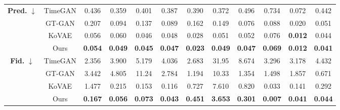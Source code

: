\documentclass{article}
\theoremstyle{plain}
\theoremstyle{definition}
\theoremstyle{remark}
\begin{document}
\begin{table}[!t]
{\begin{tabular}{cc|cccccccccc}
    \multirow{4}{*}{\textbf{Pred.} $\downarrow$} 
      & TimeGAN 
         & 0.436 
         & 0.359 
         & 0.401 
         & 0.387 
         & 0.390 
         & 0.372 
         & 0.496 
         & 0.734 
         & 0.072 
         & 0.442 \\
      & GT-GAN  
         & 0.207 
         & 0.094 
         & 0.137 
         & 0.089 
         & 0.162 
         & 0.149 
         & 0.076 
         & 0.088 
         & 0.020 
         & 0.051 \\
      & KoVAE   
         & 0.056 
         & 0.060 
         & 0.046 
         & 0.048 
         & 0.028 
         & 0.051 
         & 0.052 
         & 0.076 
         & \cellcolor{blue!10}\textbf{0.012}
         & 0.044 \\
      & Ours    
         & \cellcolor{blue!10}\textbf{0.054}
         & \cellcolor{blue!10}\textbf{0.049}
         & \cellcolor{blue!10}\textbf{0.045}
         & \cellcolor{blue!10}\textbf{0.047}
         & \cellcolor{blue!10}\textbf{0.023}
         & \cellcolor{blue!10}\textbf{0.049}
         & \cellcolor{blue!10}\textbf{0.047}
         & \cellcolor{blue!10}\textbf{0.069}
         & \cellcolor{blue!10}\textbf{0.012} 
         & \cellcolor{blue!10}\textbf{0.041} \\
    \midrule
    
    \multirow{4}{*}{\textbf{Fid.} $\downarrow$} 
      & TimeGAN 
         & 2.356 
         & 3.900 
         & 5.179 
         & 4.036 
         & 2.683 
         & 31.95 
         & 8.674 
         & 3.296 
         & 3.178 
         & 4.432 \\
      & GT-GAN  
         & 3.442 
         & 4.805 
         & 11.24 
         & 2.784 
         & 1.194 
         & 10.33 
         & 1.354 
         & 1.498 
         & 1.857 
         & 0.671 \\
      & KoVAE   
         & 1.477 
         & 0.215 
         & 0.153 
         & 0.116 
         & 0.727 
         & 7.610 
         & 0.820 
         & 0.033 
         & 0.141 
         & 0.292 \\
      & Ours    
         & \cellcolor{blue!10}\textbf{0.167}
         & \cellcolor{blue!10}\textbf{0.056}
         & \cellcolor{blue!10}\textbf{0.073}
         & \cellcolor{blue!10}\textbf{0.043}
         & \cellcolor{blue!10}\textbf{0.451}
         & \cellcolor{blue!10}\textbf{3.653}
         & \cellcolor{blue!10}\textbf{0.301}
         & \cellcolor{blue!10}\textbf{0.007}
         & \cellcolor{blue!10}\textbf{0.041}
         & \cellcolor{blue!10}\textbf{0.044} \\
    \midrule
    

\end{tabular}}
\end{table}
\end{document}
